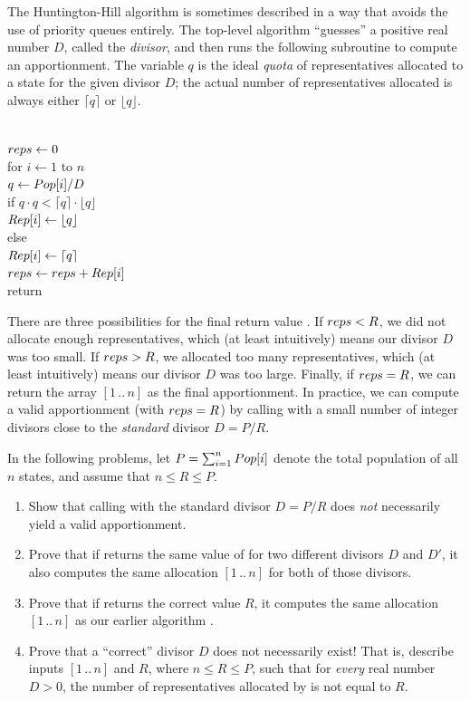 \begin{exercises}
The Huntington-Hill algorithm is sometimes described in a way that avoids the use of priority queues entirely. The top-level algorithm “guesses” a positive real number $D$, called the \textit{divisor}, and then runs the following subroutine to compute an apportionment. The variable $q$ is the ideal \textit{quota} of representatives allocated to a state for the given divisor $D$; the actual number of representatives allocated is always either $\lceil q \rceil$ or $\lfloor q \rfloor$.
\begin{pseudocode}
\\
$reps \gets 0$\\
for $i \gets 1$ to $n$\\
\Indent $q \gets Pop[i]/D$\\
\Indent if $q \cdot q < \lceil q \rceil \cdot \lfloor q \rfloor$\\
\Indent\Indent $Rep[i] \gets \lfloor q \rfloor$\\
\Indent else\\
\Indent\Indent $Rep[i] \gets \lceil q \rceil$\\
\Indent $reps \gets reps + Rep[i]$\\
return 
\end{pseudocode}
There are three possibilities for the final return value . If $reps < R$, we did not allocate enough representatives, which (at least intuitively) means our divisor $D$ was too small. If $reps > R$, we allocated too many representatives, which (at least intuitively) means our divisor $D$ was too large. Finally, if $reps = R$, we can return the array $[1\,..\,n]$ as the final apportionment. In practice, we can compute a valid apportionment (with $reps = R$) by calling  with a small number of integer divisors close to the \textit{standard} divisor $D = P/R$.

In the following problems, let $P = \sum_{i=1}^{n} Pop[i]$ denote the total population of all $n$ states, and assume that $n \le R \le P$.
\begin{enumerate}
\item Show that calling  with the standard divisor $D = P/R$ does \textit{not} necessarily yield a valid apportionment.
\item Prove that if  returns the same value of  for two different divisors $D$ and $D'$, it also computes the same allocation $[1\,..\,n]$ for both of those divisors.
\item Prove that if  returns the correct value $R$, it computes the same allocation $[1\,..\,n]$ as our earlier algorithm .
\item Prove that a “correct” divisor $D$ does not necessarily exist! That is, describe inputs $[1\,..\,n]$ and $R$, where $n \le R \le P$, such that for \textit{every} real number $D > 0$, the number of representatives allocated by  is not equal to $R$. 
\end{enumerate}
\end{exercises}
